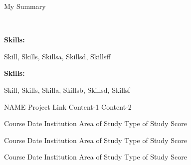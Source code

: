 \documentclass[9pt]{developercv} %
\begin{document}
    \begin{minipage}[t]{0.46\textwidth}
    \vspace{-6pt}

    My Summary\\
    \end{minipage}
    \hfill
    \
    \begin{minipage}[t]{0.465\textwidth}
    \vspace{-6pt}
    
    
        
          \begin{minipage}[t]{0.2\textwidth}
          \textbf{Skills:}
          \end{minipage}
          \hfill
          \begin{minipage}[t]{0.73\textwidth}
          Skill, Skills, Skillsa, Skillsd, Skillsff
          \end{minipage}
          \vspace{4mm}
          
          \begin{minipage}[t]{0.2\textwidth}
          \textbf{Skills:}
          \end{minipage}
          \hfill
          \begin{minipage}[t]{0.73\textwidth}
          Skill, Skills, Skilla, Skillsb, Skillsd, Skillsf
          \end{minipage}
          \vspace{4mm}
          
        
    
    
    
\end{minipage}
    
    
    \begin{entrylist}
    
      \entry
        {}
        {NAME}
        {Project Link}
        {Content-1 
        Content-2 }

      
      
        \end{entrylist}
    
    
    
    
    \vspace{-10 pt}
    \begin{entrylist}
    
    \entry
		{Course Date}
		{Institution}
		{Area of Study}
		{Type of Study \hfill \small Score}
    
    
    \entry
		{Course Date}
		{Institution}
		{Area of Study}
		{Type of Study \hfill \small Score}
    
    
    \entry
		{Course Date}
		{Institution}
		{Area of Study}
		{Type of Study \hfill \small Score}
    
    
    \end{entrylist}
    
\end{document}
